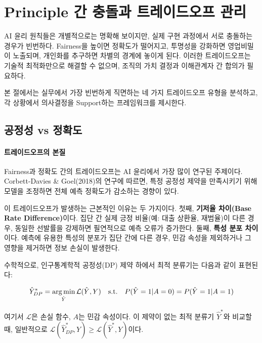 \section{Principle 간 충돌과 트레이드오프 관리}
\label{sec:3.2}

AI 윤리 원칙들은 개별적으로는 명확해 보이지만, 실제 구현 과정에서 서로 충돌하는 경우가 빈번하다. 
Fairness을 높이면 정확도가 떨어지고, 투명성을 강화하면 영업비밀이 노출되며, 
개인화를 추구하면 차별의 경계에 놓이게 된다. 
이러한 트레이드오프는 기술적 최적화만으로 해결할 수 없으며,
조직의 가치 결정과 이해관계자 간 합의가 필요하다.\cite{whittlestone2019role, selbst2019fairness}

본 절에서는 실무에서 가장 빈번하게 직면하는 네 가지 트레이드오프 유형을 분석하고, 
각 상황에서 의사결정을 Support하는 프레임워크를 제시한다.


\subsection{공정성 vs 정확도}
\label{sec:3.2.1}

\paragraph{트레이드오프의 본질}

Fairness과 정확도 간의 트레이드오프는 AI 윤리에서 가장 많이 연구된 주제이다. 
Corbett-Davies \& Goel(2018)의 연구에 따르면, 
특정 공정성 제약을 만족시키기 위해 모델을 조정하면 
전체 예측 정확도가 감소하는 경향이 있다.

이 트레이드오프가 발생하는 근본적인 이유는 두 가지이다. 
첫째, \textbf{기저율 차이(Base Rate Difference)}이다. 
집단 간 실제 긍정 비율(예: 대출 상환율, 재범율)이 다른 경우, 
동일한 선발률을 강제하면 필연적으로 예측 오류가 증가한다. 
둘째, \textbf{특성 분포 차이}이다. 
예측에 유용한 특성의 분포가 집단 간에 다른 경우, 
민감 속성을 제외하거나 그 영향을 제거하면 정보 손실이 발생한다.

수학적으로, 인구통계학적 공정성(DP) 제약 하에서 최적 분류기는 다음과 같이 표현된다:

\begin{equation}
\hat{Y}^{*}_{DP} = \operatorname*{arg\,min}_{\hat{Y}} \mathcal{L}(\hat{Y}, Y) 
\quad \text{s.t.} \quad P(\hat{Y}=1|A=0) = P(\hat{Y}=1|A=1)
\label{eq:dp_constraint}
\end{equation}

여기서 $\mathcal{L}$은 손실 함수, $A$는 민감 속성이다. 
이 제약이 없는 최적 분류기 $\hat{Y}^{*}$와 비교할 때, 
일반적으로 $\mathcal{L}(\hat{Y}^{*}_{DP}, Y) \geq \mathcal{L}(\hat{Y}^{*}, Y)$이다.


